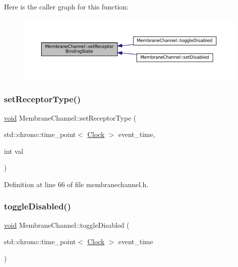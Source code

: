 Here is the caller graph for this function\+:\nopagebreak
\begin{figure}[H]
\begin{center}
\leavevmode
\includegraphics[width=350pt]{class_membrane_channel_a9f5c69ab1f4dce6113fceebaaa4f15f4_icgraph}
\end{center}
\end{figure}
\mbox{\label{class_membrane_channel_a7f40594845bb0aa6a03fd9c08a836d7e}} 
\subsubsection{\texorpdfstring{set\+Receptor\+Type()}{setReceptorType()}}
{\footnotesize\ttfamily \mbox{\hyperlink{glad_8h_a950fc91edb4504f62f1c577bf4727c29}{void}} Membrane\+Channel\+::set\+Receptor\+Type (\begin{DoxyParamCaption}\item[{std\+::chrono\+::time\+\_\+point$<$ \mbox{\hyperlink{universe_8h_a0ef8d951d1ca5ab3cfaf7ab4c7a6fd80}{Clock}} $>$}]{event\+\_\+time,  }\item[{int}]{val }\end{DoxyParamCaption})\hspace{0.3cm}{\ttfamily [inline]}}



Definition at line 66 of file membranechannel.\+h.

\mbox{\label{class_membrane_channel_aabbadec31782704dd497848154dfe0fc}} 
\subsubsection{\texorpdfstring{toggle\+Disabled()}{toggleDisabled()}}
{\footnotesize\ttfamily \mbox{\hyperlink{glad_8h_a950fc91edb4504f62f1c577bf4727c29}{void}} Membrane\+Channel\+::toggle\+Disabled (\begin{DoxyParamCaption}\item[{std\+::chrono\+::time\+\_\+point$<$ \mbox{\hyperlink{universe_8h_a0ef8d951d1ca5ab3cfaf7ab4c7a6fd80}{Clock}} $>$}]{event\+\_\+time }\end{DoxyParamCaption})\hspace{0.3cm}{\ttfamily [inline]}}



